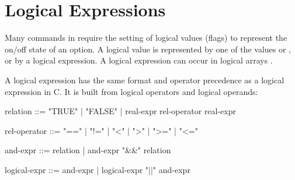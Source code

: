 \section{Logical Expressions}
\label{sec:alogical}
Many commands in \opal require the setting of logical values (flags)
to represent the on/off state of an option.
A logical value is represented by one of the values 
or , or by a logical expression.
A logical expression can occur in logical arrays .
\par
A logical expression has the same format and operator precedence as a
logical expression in C.
It is built from logical operators  and logical
operands:
\begin{example}
relation      ::= "TRUE" |
                  "FALSE" |
                  real-expr rel-operator real-expr

rel-operator  ::= "==" | "!=" | "<" | ">" | ">=" | "<="

and-expr      ::= relation | and-expr "&&" relation

logical-expr  ::= and-expr | logical-expr "||" and-expr
\end{example}

